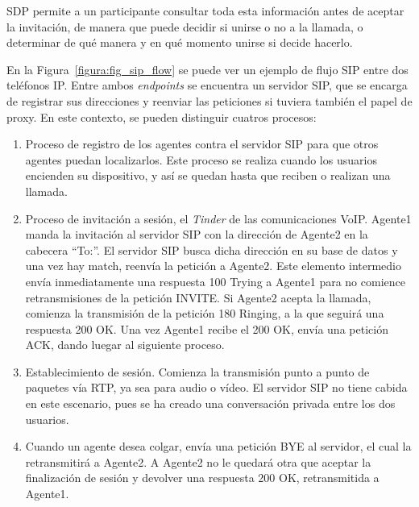\documentclass[a4paper, 12pt]{book}
\begin{document}
SDP permite a un participante consultar toda esta información antes de aceptar la invitación, de manera que puede decidir si unirse o no a la llamada, o determinar de qué manera y en qué momento unirse si decide hacerlo.

En la Figura~\ref{figura:fig_sip_flow} se puede ver un ejemplo de flujo SIP entre dos teléfonos IP. Entre ambos \emph{endpoints} se encuentra un servidor SIP, que se encarga de registrar sus direcciones y reenviar las peticiones si tuviera también el papel de proxy. En este contexto, se pueden distinguir cuatros procesos:
\begin{enumerate}
  \item Proceso de registro de los agentes contra el servidor SIP para que otros agentes puedan localizarlos. Este proceso se realiza cuando los usuarios encienden su dispositivo, y así se quedan hasta que reciben o realizan una llamada.
  \item Proceso de invitación a sesión, el \emph{Tinder} de las comunicaciones VoIP. Agente1 manda la invitación al servidor SIP con la dirección de Agente2 en la cabecera ``To:''. El servidor SIP busca dicha dirección en su base de datos y una vez hay match, reenvía la petición a Agente2. Este elemento intermedio envía inmediatamente una respuesta 100 Trying a Agente1 para no comience retransmisiones de la petición INVITE. Si Agente2 acepta la llamada, comienza la transmisión de la petición 180 Ringing, a la que seguirá una respuesta 200 OK. Una vez Agente1 recibe el 200 OK, envía una petición ACK, dando luegar al siguiente proceso.
  \item Establecimiento de sesión. Comienza la transmisión punto a punto de paquetes vía RTP, ya sea para audio o vídeo. El servidor SIP no tiene cabida en este escenario, pues se ha creado una conversación privada entre los dos usuarios.
  \item Cuando un agente desea colgar, envía una petición BYE al servidor, el cual la retransmitirá a Agente2. A Agente2 no le quedará otra que aceptar la finalización de sesión y devolver una respuesta 200 OK, retransmitida a Agente1.
\end{enumerate}
\end{document}
